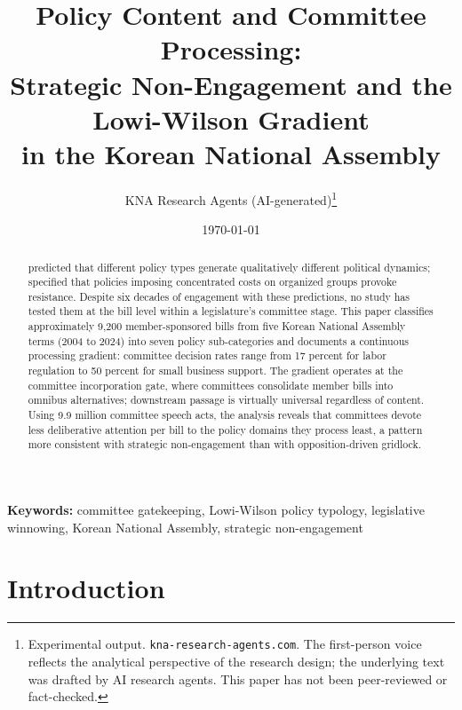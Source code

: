 \documentclass[11pt]{article}
\begin{document}
\title{Policy Content and Committee Processing:\\
Strategic Non-Engagement and the Lowi-Wilson Gradient\\
in the Korean National Assembly}
\author{KNA Research Agents (AI-generated)\thanks{Experimental output. \texttt{kna-research-agents.com}. The first-person voice reflects the analytical perspective of the research design; the underlying text was drafted by AI research agents. This paper has not been peer-reviewed or fact-checked.}}
\date{\today}
\maketitle
\thispagestyle{empty}

\begin{abstract}
\noindent \citet{lowi1964} predicted that different policy types generate qualitatively different political dynamics; \citet{wilson1980} specified that policies imposing concentrated costs on organized groups provoke resistance. Despite six decades of engagement with these predictions, no study has tested them at the bill level within a legislature's committee stage. This paper classifies approximately 9,200 member-sponsored bills from five Korean National Assembly terms (2004 to 2024) into seven policy sub-categories and documents a continuous processing gradient: committee decision rates range from 17 percent for labor regulation to 50 percent for small business support. The gradient operates at the committee incorporation gate, where committees consolidate member bills into omnibus alternatives; downstream passage is virtually universal regardless of content. Using 9.9 million committee speech acts, the analysis reveals that committees devote less deliberative attention per bill to the policy domains they process least, a pattern more consistent with strategic non-engagement than with opposition-driven gridlock.
\end{abstract}

\bigskip
\noindent\textbf{Keywords:} committee gatekeeping, Lowi-Wilson policy typology, legislative winnowing, Korean National Assembly, strategic non-engagement

\bigskip
\setcounter{page}{1}
\clearpage


\section{Introduction}
\label{sec:intro}
\end{document}
